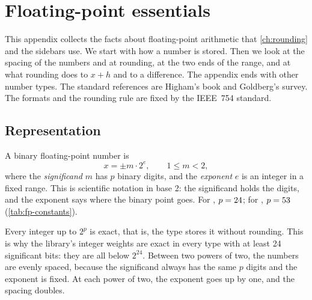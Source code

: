 \chapter{Floating-point essentials}\label{ch:floating-point}

This appendix collects the facts about floating-point arithmetic that \cref{ch:rounding} and the sidebars use. We
start with how a number is stored. Then we look at the spacing of the numbers and at rounding, at the two ends of the
range, and at what rounding does to $x + h$ and to a difference. The appendix ends with other number types. The
standard references are Higham's book and Goldberg's survey.\cite{higham2002,goldberg1991} The formats and the
rounding rule are fixed by the IEEE~754 standard.\cite{ieee754-2019}

\section{Representation}\label{sec:fp-representation}

A binary floating-point number is
\begin{equation*}
  x = \pm m \cdot 2^{e}, \qquad 1 \le m < 2,
\end{equation*}
where the \emph{significand} $m$ has $p$ binary digits, and the \emph{exponent} $e$ is an integer in a fixed range.
This is scientific notation in base 2: the significand holds the digits, and the exponent says where the binary point
goes. For , $p = \num{24}$; for , $p = \num{53}$
(\cref{tab:fp-constants}).

Every integer up to $2^{p}$ is exact, that is, the type stores it without rounding. This is why the library's integer
weights are exact in every type with at least 24 significant bits: they are all below $2^{24}$. Between two powers of
two, the numbers are evenly spaced, because the significand always has the same $p$ digits and the exponent is
fixed. At each power of two, the exponent goes up by one, and the spacing doubles.

